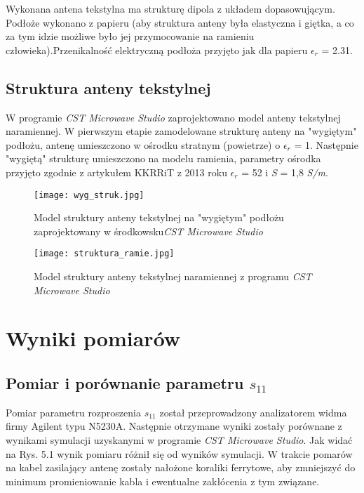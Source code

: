 Wykonana antena tekstylna ma strukturę dipola z układem dopasowującym. Podłoże wykonano z papieru (aby struktura anteny była elastyczna i giętka, a co za tym idzie możliwe było jej przymocowanie na ramieniu człowieka).Przenikalność elektryczną podłoża przyjęto jak dla papieru $\epsilon_{r}$ = 2.31.

\noindent
\newline

 
\newpage
\section{Struktura anteny tekstylnej}

W programie \emph{CST Microwave Studio} zaprojektowano  model anteny tekstylnej naramiennej.
W pierwszym etapie zamodelowane strukturę anteny na "wygiętym" podłożu, antenę umieszczono w ośrodku stratnym (powietrze) o $\epsilon_{r}$ = 1. Następnie "wygiętą" strukturę umieszczono na modelu ramienia, parametry ośrodka przyjęto zgodnie z artykułem KKRRiT z 2013 roku \cite{Artykul_1} $\epsilon_{r}$ = 52 i \emph{S} = 1,8 \emph{S/m}.


\begin{figure}[h!]
	\centering
	    \texttt{[image: wyg\_struk.jpg]}
	    \caption{Model struktury anteny tekstylnej na "wygiętym" podłożu zaprojektowany w środkowsku\emph{CST Microwave Studio}}
\end{figure}



\begin{figure}[h!]
	\centering
	    \texttt{[image: struktura\_ramie.jpg]}
	    \caption{Model struktury anteny tekstylnej naramiennej z programu \emph{CST Microwave Studio}}
\end{figure}


\chapter{Wyniki pomiarów}

\section{Pomiar i porównanie parametru $s_{11}$}

Pomiar parametru rozproszenia $s_{11}$ został przeprowadzony analizatorem widma firmy Agilent typu N5230A. Następnie otrzymane wyniki zostały porównane z wynikami symulacji uzyskanymi w programie \emph{CST Microwave Studio}. Jak widać na Rys. 5.1 wynik pomiaru różnił się od wyników symulacji. W trakcie pomarów na kabel zasilający antenę zostały nałożone koraliki ferrytowe, aby zmniejszyć do minimum promieniowanie kabla i ewentualne zakłócenia z tym związane. 


